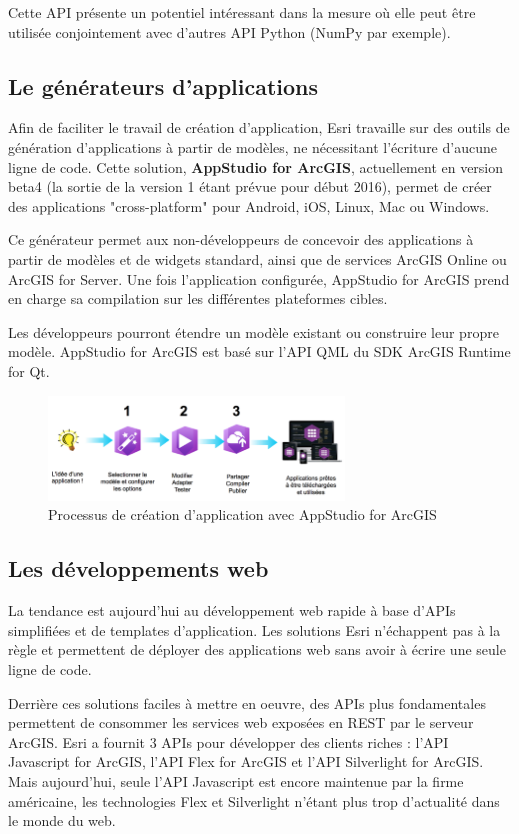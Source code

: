 \documentclass[11pt]{article}
\begin{document}
Cette API présente un potentiel intéressant dans la mesure où elle peut être utilisée conjointement avec d'autres API Python (NumPy par exemple).


\subsection{Le générateurs d'applications}
Afin de faciliter le travail de création d'application, Esri travaille sur des outils de génération d'applications à partir de modèles, ne nécessitant l'écriture d'aucune ligne de code. Cette solution, \textbf{AppStudio for ArcGIS}, actuellement en version beta4 (la sortie de la version 1 étant prévue pour début 2016), permet de créer des applications "cross-platform" pour Android, iOS, Linux, Mac ou Windows.

Ce générateur permet aux non-développeurs de concevoir des applications à partir de modèles et de widgets standard, ainsi que de services ArcGIS Online ou ArcGIS for Server. Une fois l'application configurée, AppStudio for ArcGIS prend en charge sa compilation sur les différentes plateformes cibles. 

Les développeurs pourront étendre un modèle existant ou construire leur propre modèle. AppStudio for ArcGIS est basé sur l'API QML du SDK ArcGIS Runtime for Qt.

\begin{figure}[!h]
	\center \includegraphics[width=0.70\textwidth]{img/cours/AppStudio_for_ArcGIS-2.png}
	\caption{Processus de création d'application avec AppStudio for ArcGIS}
\end{figure}



\subsection{Les développements web}
La tendance est aujourd’hui au développement web rapide à base d’APIs simplifiées et de templates d’application. Les solutions Esri n'échappent pas à la règle et permettent de déployer des applications web sans avoir à écrire une seule ligne de code. 

Derrière ces solutions faciles à mettre en oeuvre, des APIs plus fondamentales permettent de consommer les services web exposées en REST par le serveur ArcGIS. Esri a fournit 3 APIs pour développer des clients riches : l'API Javascript for ArcGIS, l'API Flex for ArcGIS et l'API Silverlight for ArcGIS. Mais aujourd'hui, seule l'API Javascript est encore maintenue par la firme américaine, les technologies Flex et Silverlight n'étant plus trop d'actualité dans le monde du web.
\end{document}
